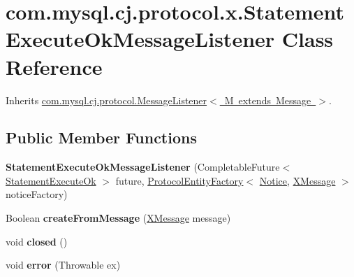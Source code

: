 \hypertarget{classcom_1_1mysql_1_1cj_1_1protocol_1_1x_1_1_statement_execute_ok_message_listener}{}\section{com.\+mysql.\+cj.\+protocol.\+x.\+Statement\+Execute\+Ok\+Message\+Listener Class Reference}
\label{classcom_1_1mysql_1_1cj_1_1protocol_1_1x_1_1_statement_execute_ok_message_listener}


Inherits \mbox{\hyperlink{interfacecom_1_1mysql_1_1cj_1_1protocol_1_1_message_listener}{com.\+mysql.\+cj.\+protocol.\+Message\+Listener$<$ M extends Message $>$}}.

\subsection*{Public Member Functions}
\begin{DoxyCompactItemize}
\item 
\mbox{\label{classcom_1_1mysql_1_1cj_1_1protocol_1_1x_1_1_statement_execute_ok_message_listener_adde803d9a59bfb47ff7a43941d375655}} 
{\bfseries Statement\+Execute\+Ok\+Message\+Listener} (Completable\+Future$<$ \mbox{\hyperlink{classcom_1_1mysql_1_1cj_1_1protocol_1_1x_1_1_statement_execute_ok}{Statement\+Execute\+Ok}} $>$ future, \mbox{\hyperlink{interfacecom_1_1mysql_1_1cj_1_1protocol_1_1_protocol_entity_factory}{Protocol\+Entity\+Factory}}$<$ \mbox{\hyperlink{classcom_1_1mysql_1_1cj_1_1protocol_1_1x_1_1_notice}{Notice}}, \mbox{\hyperlink{classcom_1_1mysql_1_1cj_1_1protocol_1_1x_1_1_x_message}{X\+Message}} $>$ notice\+Factory)
\item 
\mbox{\label{classcom_1_1mysql_1_1cj_1_1protocol_1_1x_1_1_statement_execute_ok_message_listener_aea503e89dd40c8375a9bdd26626ff16e}} 
Boolean {\bfseries create\+From\+Message} (\mbox{\hyperlink{classcom_1_1mysql_1_1cj_1_1protocol_1_1x_1_1_x_message}{X\+Message}} message)
\item 
\mbox{\label{classcom_1_1mysql_1_1cj_1_1protocol_1_1x_1_1_statement_execute_ok_message_listener_a9451a156729766ae954e065537f03178}} 
void {\bfseries closed} ()
\item 
\mbox{\label{classcom_1_1mysql_1_1cj_1_1protocol_1_1x_1_1_statement_execute_ok_message_listener_abce681bc363086c23732d92c3fb8bce9}} 
void {\bfseries error} (Throwable ex)
\end{DoxyCompactItemize}


